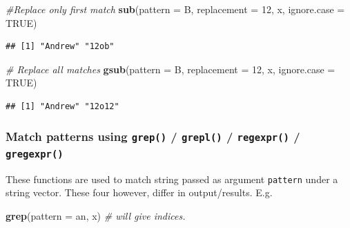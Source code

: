 \documentclass[
]{book}
\newenvironment{Shaded}{\begin{snugshade}}{\end{snugshade}}
\newcommand{\AttributeTok}[1]{\textcolor[rgb]{0.13,0.29,0.53}{#1}}
\newcommand{\CommentTok}[1]{\textcolor[rgb]{0.56,0.35,0.01}{\textit{#1}}}
\newcommand{\ConstantTok}[1]{\textcolor[rgb]{0.56,0.35,0.01}{#1}}
\newcommand{\FunctionTok}[1]{\textcolor[rgb]{0.13,0.29,0.53}{\textbf{#1}}}
\newcommand{\NormalTok}[1]{#1}
\newcommand{\StringTok}[1]{\textcolor[rgb]{0.31,0.60,0.02}{#1}}
\begin{document}
\begin{Shaded}
\begin{Highlighting}[]
\CommentTok{\#Replace only first match}
\FunctionTok{sub}\NormalTok{(}\AttributeTok{pattern =} \StringTok{\textquotesingle{}B\textquotesingle{}}\NormalTok{, }\AttributeTok{replacement =} \StringTok{\textquotesingle{}12\textquotesingle{}}\NormalTok{, x, }\AttributeTok{ignore.case =} \ConstantTok{TRUE}\NormalTok{)}
\end{Highlighting}
\end{Shaded}

\begin{verbatim}
## [1] "Andrew" "12ob"
\end{verbatim}

\begin{Shaded}
\begin{Highlighting}[]
\CommentTok{\# Replace all matches}
\FunctionTok{gsub}\NormalTok{(}\AttributeTok{pattern =} \StringTok{\textquotesingle{}B\textquotesingle{}}\NormalTok{, }\AttributeTok{replacement =} \StringTok{\textquotesingle{}12\textquotesingle{}}\NormalTok{, x, }\AttributeTok{ignore.case =} \ConstantTok{TRUE}\NormalTok{)}
\end{Highlighting}
\end{Shaded}

\begin{verbatim}
## [1] "Andrew" "12o12"
\end{verbatim}

\hypertarget{match-patterns-using-grep-grepl-regexpr-gregexpr}{%
\subsubsection*{\texorpdfstring{Match patterns using \texttt{grep()} / \texttt{grepl()} / \texttt{regexpr()} / \texttt{gregexpr()}}{Match patterns using grep() / grepl() / regexpr() / gregexpr()}}\label{match-patterns-using-grep-grepl-regexpr-gregexpr}}

These functions are used to match string passed as argument \texttt{pattern} under a string vector. These four however, differ in output/results. E.g.

\begin{Shaded}
\begin{Highlighting}[]
\FunctionTok{grep}\NormalTok{(}\AttributeTok{pattern =} \StringTok{\textquotesingle{}an\textquotesingle{}}\NormalTok{, x) }\CommentTok{\# will give indices.  }
\end{Highlighting}
\end{Shaded}
\end{document}
